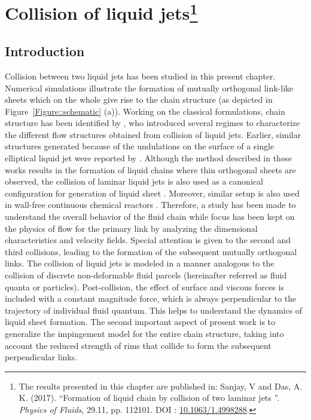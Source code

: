 \chapter[Collision of liquid jets]{Collision of liquid jets\footnote{The results presented in this chapter are published in: Sanjay, V and Das, A. K. (2017). \textquotedblleft Formation of liquid chain by collision of two laminar jets \textquotedblright. \textit{Physics of Fluids}, 29.11, pp. 112101. DOI : \href{https://aip.scitation.org/doi/full/10.1063/1.4998288}{\color{black}10.1063/1.4998288}.}}\label{Chapter::jetJet}
\section{Introduction}
Collision between two liquid jets has been studied in this present chapter. Numerical simulations illustrate the formation of mutually orthogonal link-like sheets which on the whole give rise to the chain structure (as depicted in Figure~\ref{Figure::schematic} (a)). Working on the classical formulations, chain structure has been identified by \citet{bush2004collision}, who introduced several regimes to characterize the different flow structures obtained from collision of liquid jets. Earlier, similar structures generated because of the undulations on the surface of a single elliptical liquid jet were reported by \citet{rayleigh1879capillary,rayleigh1889tension}. Although the method described in these works results in the formation of liquid chains where thin orthogonal sheets are observed, the collision of laminar liquid jets is also used as a canonical configuration for generation of liquid sheet \citep{bush2004collision}. Moreover, similar setup is also used in wall-free continuous chemical reactors \citep{erni2013free}. Therefore, a study has been made to understand the overall behavior of the fluid chain while focus has been kept on the physics of flow for the primary link by analyzing the dimensional characteristics and velocity fields. Special attention is given to the second and third collisions, leading to the formation of the subsequent mutually orthogonal links. The collision of liquid jets is modeled in a manner analogous to the collision of discrete non-deformable fluid parcels (hereinafter referred as fluid quanta or particles). Post-collision, the effect of surface and viscous forces is included with a constant magnitude force, which is always perpendicular to the trajectory of individual fluid quantum. This helps to understand the dynamics of liquid sheet formation. The second important aspect of present work is to generalize the impingement model for the entire chain structure, taking into account the reduced strength of rims that collide to form the subsequent perpendicular links.
